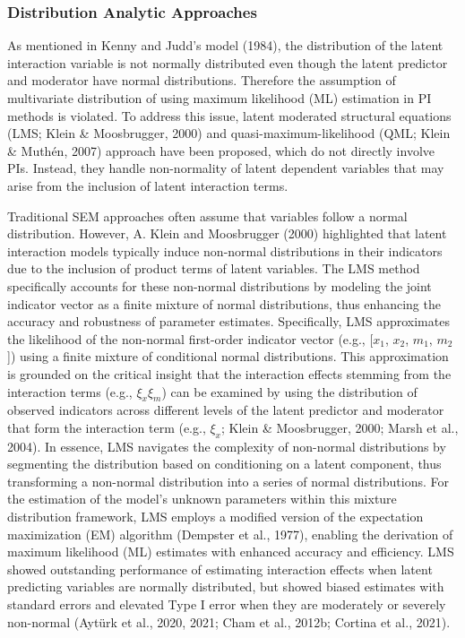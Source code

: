 \documentclass[
  man]{apa6}
\begin{document}
\hypertarget{distribution-analytic-approaches}{%
\subsubsection{Distribution Analytic Approaches}\label{distribution-analytic-approaches}}

As mentioned in Kenny and Judd's model (1984), the distribution of the latent interaction variable is not normally distributed even though the latent predictor and moderator have normal distributions. Therefore the assumption of multivariate distribution of using maximum likelihood (ML) estimation in PI methods is violated. To address this issue, latent moderated structural equations (LMS; Klein \& Moosbrugger, 2000) and quasi-maximum-likelihood (QML; Klein \& Muthén, 2007) approach have been proposed, which do not directly involve PIs. Instead, they handle non-normality of latent dependent variables that may arise from the inclusion of latent interaction terms.

Traditional SEM approaches often assume that variables follow a normal distribution. However, A. Klein and Moosbrugger (2000) highlighted that latent interaction models typically induce non-normal distributions in their indicators due to the inclusion of product terms of latent variables. The LMS method specifically accounts for these non-normal distributions by modeling the joint indicator vector as a finite mixture of normal distributions, thus enhancing the accuracy and robustness of parameter estimates. Specifically, LMS approximates the likelihood of the non-normal first-order indicator vector (e.g., {[}\(x_{1}\), \(x_{2}\), \(m_{1}\), \(m_{2}\){]}) using a finite mixture of conditional normal distributions. This approximation is grounded on the critical insight that the interaction effects stemming from the interaction terms (e.g., \(\xi_{x}\xi_{m}\)) can be examined by using the distribution of observed indicators across different levels of the latent predictor and moderator that form the interaction term (e.g., \(\xi_{x}\); Klein \& Moosbrugger, 2000; Marsh et al., 2004). In essence, LMS navigates the complexity of non-normal distributions by segmenting the distribution based on conditioning on a latent component, thus transforming a non-normal distribution into a series of normal distributions. For the estimation of the model's unknown parameters within this mixture distribution framework, LMS employs a modified version of the expectation maximization (EM) algorithm (Dempster et al., 1977), enabling the derivation of maximum likelihood (ML) estimates with enhanced accuracy and efficiency. LMS showed outstanding performance of estimating interaction effects when latent predicting variables are normally distributed, but showed biased estimates with standard errors and elevated Type I error when they are moderately or severely non-normal (Aytürk et al., 2020, 2021; Cham et al., 2012b; Cortina et al., 2021).
\end{document}
